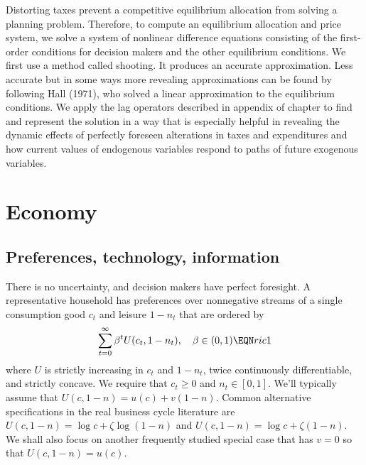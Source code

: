 Distorting taxes prevent a competitive equilibrium allocation
from solving a planning problem. Therefore, to compute an equilibrium allocation and price
system, we
solve a system of nonlinear difference equations consisting of the
first-order conditions for decision makers and the other
equilibrium conditions.  We first use a method called shooting. It  produces an accurate
approximation. Less accurate but in some ways more revealing
approximations can be found by following Hall (1971), who solved a
 linear approximation to the equilibrium conditions.
We  apply the lag operators described in appendix  of chapter   to find and represent the solution in a way that is
especially helpful in revealing the dynamic effects of perfectly
foreseen alterations in   taxes and expenditures and  how current values of
 endogenous
variables respond to paths of future exogenous variables.  %

\section{Economy}

\subsection{Preferences, technology, information}

There is no uncertainty,  and decision makers have perfect foresight.
A representative household has preferences over nonnegative streams of
a single
consumption good $c_t$ and leisure $1-n_t$ that are ordered by
$$ \sum_{t=0}^\infty \beta^t U(c_t, 1-n_t), \quad \beta \in (0,1) \EQN ric1 $$
where $U$ is strictly increasing in $c_t  $ and $1-n_t $, twice
continuously differentiable, and strictly concave. We require that $c_t \geq 0 $
and $n_t \in [0,1]$.  We'll
typically assume that $U(c,1-n) = u(c)+v(1-n)$. Common alternative
specifications in the real business cycle literature are $U(c,1-n)
= \log c + \zeta \log (1-n)$ and $U(c,1-n) = \log c + \zeta
(1-n)$.
%
%
%
 We shall also focus on
another frequently studied special case that
 has $v=0$ so that $U(c,1-n)=u(c)$.

